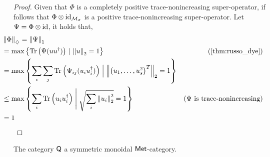   \begin{proof}
    Given that $\Phi$ is a  completely positive trace-nonincreasing super-operator, if follows that $ \Phi \otimes  \mathrm{id}_{\mathcal{M}_{\sigma}}$ is a positive trace-nonincreasing super-operator. Let $\Psi = \Phi \otimes \mathrm{id}$, it holds that,
    \begin{align*}
      & \hspace{-20pt} \diamondnorm{\Phi} =\tracenorm{\Psi}\\
      &  \hspace{-20pt} = \max \left\{\tr \left( \Psi (u u^\dag)\right) \, \vert \, \euclideannorm{u}=1 \right\}  & \left(\text{\autoref{thm:russo_dye}}\right)\\
      & \hspace{-20pt} = \max \left\{ \sum_i \sum_j \tr \left( \Psi_{ij} (u_i u_i^\dag)\right) \Bigm|  \euclideannorm{\begin{pmatrix} u_1, \ldots, u_s^2 \end{pmatrix}^T}=1 \right\} \\
      &  \hspace{-20pt} \leq \max \left\{ \sum_i \tr \left( u_i u_i^\dag \right) \Biggm| \sqrt{\sum_i \euclideannorm{u_i}^2}=1 \right\}   & (\Psi \text{ is trace-nonincreasing}) \\
      &  \hspace{-20pt} = 1
    \end{align*}
    
    
    
  \end{proof}

  

\begin{proposition} \label{prop:Q_monoidal} 
  The category $\mathsf{Q}$ a symmetric monoidal $\mathsf{Met}$-category.
\end{proposition}


